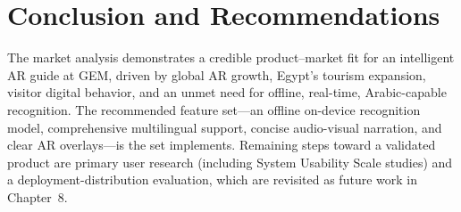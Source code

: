 \section{Conclusion and Recommendations}

The market analysis demonstrates a credible product--market fit for an intelligent AR
guide at GEM, driven by global AR growth, Egypt's tourism expansion, visitor digital
behavior, and an unmet need for offline, real-time, Arabic-capable recognition. The
recommended feature set---an offline on-device recognition model, comprehensive
multilingual support, concise audio-visual narration, and clear AR overlays---is the
set \TimeLens{} implements. Remaining steps toward a validated product are primary user
research (including System Usability Scale studies) and a deployment-distribution
evaluation, which are revisited as future work in Chapter~8.
